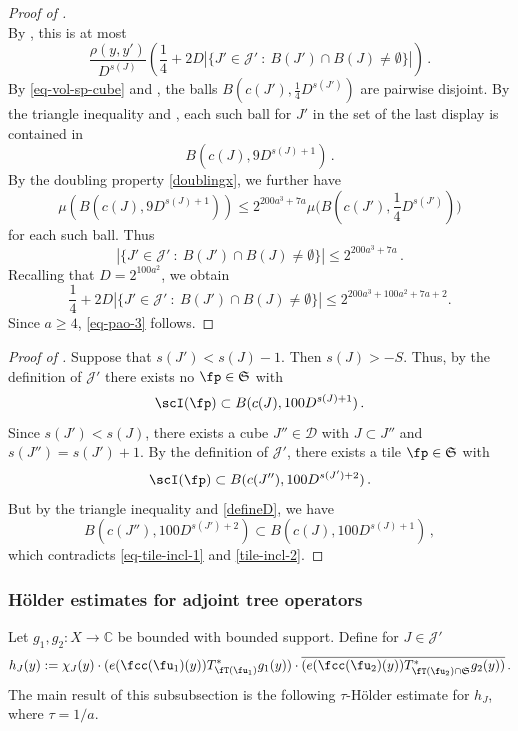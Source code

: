 \begin{proof}[Proof of ]
$$        $$
        By , this is at most
        $$
             \frac{\rho(y,y')}{D^{s(J)}} \left( \frac{1}{4} + 2D |\{J' \in \mathcal{J}' \ : \ B(J') \cap B(J) \ne \emptyset\}|\right)\,.
        $$
        By \eqref{eq-vol-sp-cube} and , the balls $B(c(J'), \frac{1}{4} D^{s(J')})$ are pairwise disjoint. By the triangle inequality and , each such ball for $J'$ in the set of the last display is contained in
        $$
            B(c(J), 9 D^{s(J) + 1})\,.
        $$
        By the doubling property \eqref{doublingx}, we further have
        $$
            \mu(B(c(J), 9 D^{s(J) + 1})) \le 2^{200a^3 + 7a} \mu\Big(B(c(J'), \frac{1}{4}D^{s(J')})\Big)
        $$
        for each such ball.
        Thus
        $$
            |\{J' \in \mathcal{J}' \ : \ B(J') \cap B(J) \ne \emptyset\}| \le 2^{200a^3 + 7a}\,.
        $$
        Recalling that $D=2^{100a^2}$, we obtain
        $$\frac{1}{4} + 2D |\{J' \in \mathcal{J}' \ : \ B(J') \cap B(J) \ne \emptyset\}|\leq 2^{200a^3 + 100a^2 + 7a + 2}.$$
        Since $a\ge 4$, \eqref{eq-pao-3} follows.
    \end{proof}

    \begin{proof}[Proof of ]
        \leanok
        Suppose that $s(J') < s(J) - 1$. Then $s(J) > -S$. Thus, by the definition of $\mathcal{J}'$ there exists no $\fp \in \mathfrak{S}$ with
      \begin{equation}
            \label{eq-tile-incl-1}
            \scI(\fp) \subset B(c(J), 100D^{s(J) + 1})\,.
        \end{equation}
        Since $s(J') < s(J)$, there exists a cube $J'' \in \mathcal{D}$ with $J \subset J''$ and $s(J'') = s(J') + 1$. By the definition of $\mathcal{J}'$, there exists a tile $\fp \in \mathfrak{S}$ with
      \begin{equation}
            \label{tile-incl-2}
            \scI(\fp) \subset B(c(J''), 100 D^{s(J')+2})\,.
        \end{equation}
        But by the triangle inequality and \eqref{defineD}, we have
        $$
            B(c(J''), 100 D^{s(J')+2}) \subset B(c(J), 100D^{s(J) + 1})\,,
        $$
        which contradicts \eqref{eq-tile-incl-1} and \eqref{tile-incl-2}.
    \end{proof}


\subsubsection{H\"older estimates for adjoint tree operators}
\label{subsubsec-holder-estimates}
    Let $g_1, g_2:X \to \mathbb{C}$ be bounded with bounded support.
    Define for $J \in \mathcal{J}'$
    \begin{equation}
        \label{def-hj}
        h_J(y) := \chi_J(y)\cdot(e(\fcc(\fu_1)(y)) T_{\fT(\fu_1)}^* g_1(y)) \cdot \overline{(e(\fcc(\fu_2)(y)) T_{\fT(\fu_2) \cap \mathfrak{S}}^* g_2(y))}\,.
    \end{equation}
    The main result of this subsubsection is the following $\tau$-H\"older estimate for $h_J$, where $\tau = 1/a$.

